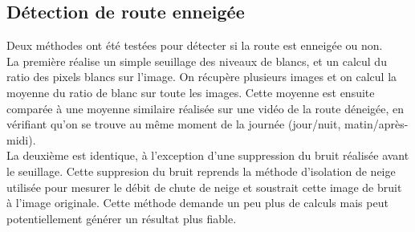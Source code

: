 \newpage

\subsection{Détection de route enneigée}
Deux méthodes ont été testées pour détecter si la route est enneigée ou non.\\
La première réalise un simple seuillage des niveaux de blancs, et un calcul
du ratio des pixels blancs sur l'image. On récupère plusieurs images et on
calcul la moyenne du ratio de blanc sur toute les images.
Cette moyenne est ensuite comparée à une moyenne similaire réalisée sur une
vidéo de la route déneigée, en vérifiant qu'on se trouve au même moment de
la journée (jour/nuit, matin/après-midi).\\
La deuxième est identique, à l'exception d'une suppression du bruit réalisée
avant le seuillage. Cette suppresion du bruit reprends la méthode d'isolation
de neige utilisée pour mesurer le débit de chute de neige et soustrait cette image
de bruit à l'image originale. Cette méthode demande un peu plus de calculs mais peut
potentiellement générer un résultat plus fiable.


